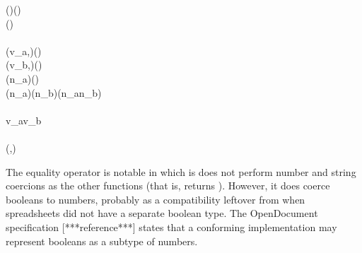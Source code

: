 \begin{hscode}
\>[B]{}\;\;\;(\;){}\<[40]%
\>[40]{}\mathrel{=}\;{}\<[49]%
\>[49]{}(\mathbin{*})\;{}\<[55]%
\>[55]{}\;\;\;\<[E]%
\\[\blanklineskip]%
\>[B]{}\;\;\;(\;)\mathrel{=}{}\<[E]%
\\
\>[B]{}\<[4]%
\>[4]{}\<[E]%
\\
\>[4]{}\<[7]%
\>[7]{}(v_a,{}\<[13]%
\>[13]{}){}\<[20]%
\>[20]{}\mathrel{=}\mathbin{\$}(\;)\;\;\;{}\<[54]%
\>[54]{}\<[E]%
\\
\>[4]{}\<[7]%
\>[7]{}(v_b,{}\<[13]%
\>[13]{}){}\<[20]%
\>[20]{}\mathrel{=}\mathbin{\$}(\;)\;\;\;{}\<[54]%
\>[54]{}\<[E]%
\\[\blanklineskip]%
\>[4]{}\<[7]%
\>[7]{}\;{}\<[14]%
\>[14]{}(\;n_a)\;{}\<[29]%
\>[29]{}(\;){}\<[44]%
\>[44]{}\mathrel{=}\;\<[E]%
\\
\>[4]{}\<[7]%
\>[7]{}\;{}\<[14]%
\>[14]{}(\;n_a)\;{}\<[29]%
\>[29]{}(\;n_b){}\<[44]%
\>[44]{}\mathrel{=}\;(n_a\mathbin{/}n_b){}\<[E]%
\\
\>[4]{}\<[7]%
\>[7]{}\;{}\<[14]%
\>[14]{}\anonymous \;{}\<[29]%
\>[29]{}\anonymous {}\<[44]%
\>[44]{}\mathrel{=}\;\<[E]%
\\[\blanklineskip]%
\>[4]{}\<[7]%
\>[7]{}\mathrel{=}\;\;v_a\;v_b{}\<[E]%
\\
\>[B]{}\<[4]%
\>[4]{}\<[E]%
\\
\>[4]{}\<[7]%
\>[7]{}(,){}\<[E]%
\ColumnHook
\end{hscode}\resethooks

The equality operator is notable in which is does not perform number and
string coercions as the other functions (that is,  returns ).
However, it does coerce booleans to numbers, probably as a compatibility
leftover from when spreadsheets did not have a separate boolean type.
The OpenDocument specification [***reference***] states that a conforming
implementation may represent booleans as a subtype of numbers.

